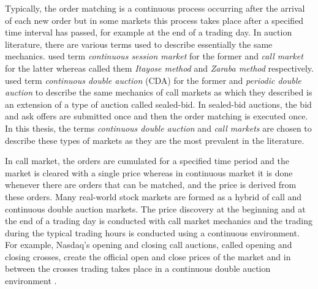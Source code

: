 Typically, the order matching 
is a continuous process occurring after the arrival of each new order but
in some markets this process takes place after a specified time interval
has passed, for example at the end of a trading day. \citep{boer05}
In auction literature, there are various terms used to describe essentially 
the same mechanics. \citet{boer05} used term 
\textit{continuous session market} for the former and \textit{call market}
for the latter whereas \citet{ASt05} called them \textit{Itayose method}
and \textit{Zaraba method} respectively. \citet{Moc15} used term \textit{continuous 
double auction} (CDA) for the former and \textit{periodic double auction} to describe 
the same mechanics of call markets as which they described is an extension of 
a type of auction called sealed-bid. In sealed-bid auctions, the bid and ask offers
are submitted once and then the order matching is executed once. In this thesis,
the terms \textit{continuous double auction} and \textit{call markets} are chosen to describe
these types of markets as they are the most prevalent in the literature.

In call market, the orders are cumulated for a specified time period and the
market is cleared with a single price whereas in continuous market it is done
whenever there are orders that can be matched, and the price is derived from these
orders. \citep{boer05} 
Many real-world stock markets are formed as a hybrid of call and continuous
double auction markets. The price discovery at the beginning and at the end of a 
trading day is conducted with call market mechanics and the trading during the 
typical trading hours is conducted using a continuous environment. \citep{NasdaqClosing05}
For example, Nasdaq's opening and closing call auctions, called opening and closing crosses,
create the official open and close prices of the market and in between the crosses 
trading takes place in a continuous double auction environment \citep{NasdaqCrosses}.  
 
